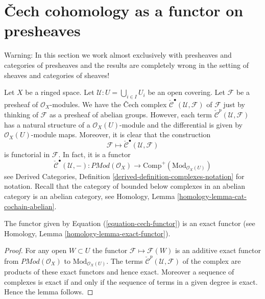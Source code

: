 \section{{\v C}ech cohomology as a functor on presheaves}
\label{section-cech-functor}

\noindent
Warning: In this section we work almost exclusively with presheaves and
categories of presheaves and the results are completely wrong in the
setting of sheaves and categories of sheaves!

\medskip\noindent
Let $X$ be a ringed space.
Let $\mathcal{U} : U = \bigcup_{i \in I} U_i$ be an open covering.
Let $\mathcal{F}$ be a presheaf of $\mathcal{O}_X$-modules.
We have the {\v C}ech complex
$\check{\mathcal{C}}^\bullet(\mathcal{U}, \mathcal{F})$
of $\mathcal{F}$ just by thinking of $\mathcal{F}$
as a presheaf of abelian groups. However, each term
$\check{\mathcal{C}}^p(\mathcal{U}, \mathcal{F})$ has a natural
structure of a $\mathcal{O}_X(U)$-module and the differential is given by
$\mathcal{O}_X(U)$-module maps. Moreover, it is clear that the
construction
$$
\mathcal{F} \longmapsto \check{\mathcal{C}}^\bullet(\mathcal{U}, \mathcal{F})
$$
is functorial in $\mathcal{F}$. In fact, it is a functor
\begin{equation}
\label{equation-cech-functor}
\check{\mathcal{C}}^\bullet(\mathcal{U}, -) :
\textit{PMod}(\mathcal{O}_X)
\longrightarrow
\text{Comp}^{+}(\text{Mod}_{\mathcal{O}_X(U)})
\end{equation}
see
Derived Categories, Definition \ref{derived-definition-complexes-notation}
for notation. Recall that the category of bounded below complexes
in an abelian category is an abelian category, see
Homology, Lemma \ref{homology-lemma-cat-cochain-abelian}.

\begin{lemma}
\label{lemma-cech-exact-presheaves}
The functor given by Equation (\ref{equation-cech-functor})
is an exact functor (see Homology, Lemma \ref{homology-lemma-exact-functor}).
\end{lemma}

\begin{proof}
For any open $W \subset U$ the functor
$\mathcal{F} \mapsto \mathcal{F}(W)$ is an additive exact functor
from $\textit{PMod}(\mathcal{O}_X)$ to $\text{Mod}_{\mathcal{O}_X(U)}$.
The terms
$\check{\mathcal{C}}^p(\mathcal{U}, \mathcal{F})$
of the complex are products of these exact functors and hence exact.
Moreover a sequence of complexes is exact if and only if the sequence
of terms in a given degree is exact. Hence the lemma follows.
\end{proof}

